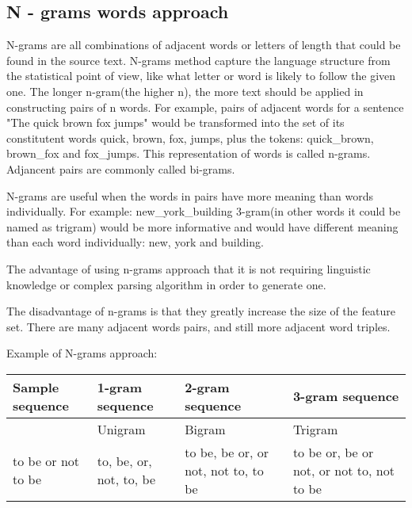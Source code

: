 \subsection{N - grams words approach}
N-grams \cite[]{BIB3} are all combinations of adjacent words or letters of length  that could be found in the source text. N-grams method capture the language structure from the statistical point of view, like what letter or word is likely to follow the given one. The longer n-gram(the higher n), the more text should be applied in constructing pairs of n words. For example, pairs of adjacent words for a sentence "The quick brown fox jumps" would be transformed into the set of its constitutent words {quick, brown, fox, jumps}, plus the tokens: quick\_brown, brown\_fox and fox\_jumps. This representation of words is called n-grams. Adjancent pairs are commonly called bi-grams. 

N-grams are useful when the words in pairs have more meaning than words individually. For example: new\_york\_building 3-gram(in other words it could be named as trigram) would be more informative and would have different meaning than each word individually: new, york and building. 

The advantage of using n-grams approach that it is not requiring linguistic knowledge or complex parsing algorithm in order to generate one. 

The disadvantage of n-grams is that they greatly increase the size of the feature set. There are many adjacent words pairs, and still more adjacent word triples. 

Example of N-grams approach:

\begin{table}[H]\centering
\begin{tabular}{|l|l|p{3.5cm}|p{3.5cm}|}\hline
 Sample sequence & 1-gram sequence & 2-gram sequence & 3-gram sequence  \\ \hline
 & Unigram & Bigram & Trigram   \\\hline
  to be or not to be & to, be, or, not, to, be & to be, be or, or not, not to, to be & to be or, be or not, or not to, not to be\\\hline
\end{tabular}
\label{table: ngram_table}
\end{table}

